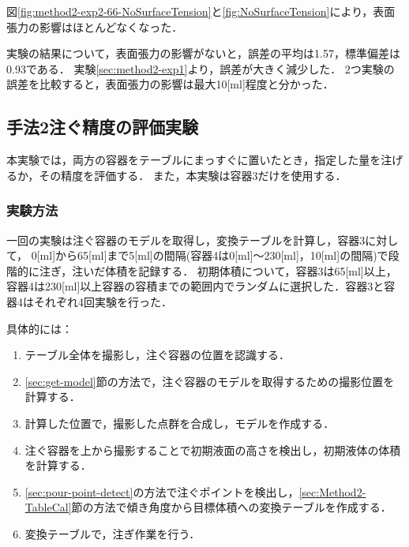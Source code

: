 		図\ref{fig:method2-exp2-66-NoSurfaceTension}と\ref{fig:NoSurfaceTension}により，表面張力の影響はほとんどなくなった．
		
		実験の結果について，表面張力の影響がないと，誤差の平均は1.57，標準偏差は0.93である．
		実験\ref{sec:method2-exp1}より，誤差が大きく減少した．
		2つ実験の誤差を比較すると，表面張力の影響は最大10[ml]程度と分かった．
		
	
	
		
	\subsection{手法2注ぐ精度の評価実験}\label{sec:Method2-expAll}
	本実験では，両方の容器をテーブルにまっすぐに置いたとき，指定した量を注げるか，その精度を評価する．
	また，本実験は容器3だけを使用する．
		
		\subsubsection{実験方法}
		一回の実験は注ぐ容器のモデルを取得し，変換テーブルを計算し，容器3に対して，
		0[ml]から65[ml]まで5[ml]の間隔(容器4は0[ml]〜230[ml]，10[ml]の間隔)で段階的に注ぎ，注いだ体積を記録する．
		初期体積について，容器3は65[ml]以上，容器4は230[ml]以上容器の容積までの範囲内でランダムに選択した．容器3と容器4はそれぞれ4回実験を行った．
		
		具体的には：
    		\begin{enumerate}
    		\item テーブル全体を撮影し，注ぐ容器の位置を認識する．
        	\item \ref{sec:get-model}節の方法で，注ぐ容器のモデルを取得するための撮影位置を計算する．
        	\item 計算した位置で，撮影した点群を合成し，モデルを作成する．
    		\item 注ぐ容器を上から撮影することで初期液面の高さを検出し，初期液体の体積を計算する．
    		\item \ref{sec:pour-point-detect}の方法で注ぐポイントを検出し，\ref{sec:Method2-TableCal}節の方法で傾き角度から目標体積への変換テーブルを作成する．
    		\item 変換テーブルで，注ぎ作業を行う．
    		\end{enumerate}
    				
